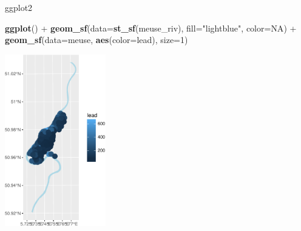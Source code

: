 \documentclass[11pt,ignorenonframetext,]{beamer}
\newenvironment{Shaded}{}{}
\newcommand{\KeywordTok}[1]{\textcolor[rgb]{0.00,0.44,0.13}{\textbf{#1}}}
\newcommand{\DataTypeTok}[1]{\textcolor[rgb]{0.56,0.13,0.00}{#1}}
\newcommand{\DecValTok}[1]{\textcolor[rgb]{0.25,0.63,0.44}{#1}}
\newcommand{\StringTok}[1]{\textcolor[rgb]{0.25,0.44,0.63}{#1}}
\newcommand{\OtherTok}[1]{\textcolor[rgb]{0.00,0.44,0.13}{#1}}
\newcommand{\OperatorTok}[1]{\textcolor[rgb]{0.40,0.40,0.40}{#1}}
\newcommand{\NormalTok}[1]{#1}
\let\oldShaded\Shaded
\let\endoldShaded\endShaded
\renewenvironment{Shaded}{\footnotesize\begin{spacing}{0.9}\oldShaded}{\endoldShaded\end{spacing}}
\let\oldverbatim\verbatim
\let\endoldverbatim\endverbatim
\newcommand{\scriptoutput}{
  \renewenvironment{Shaded}{\scriptsize\begin{spacing}{0.9}\oldShaded}{\endoldShaded\end{spacing}}
  \renewenvironment{verbatim}{\scriptsize\begin{spacing}{0.9}\oldverbatim}{\endoldverbatim\end{spacing}}
}
\begin{document}
\begin{frame}[fragile,t]{ggplot2}

\scriptoutput

\begin{Shaded}
\begin{Highlighting}[]
\KeywordTok{ggplot}\NormalTok{() }\OperatorTok{+}
\StringTok{  }\KeywordTok{geom_sf}\NormalTok{(}\DataTypeTok{data=}\KeywordTok{st_sf}\NormalTok{(meuse_riv), }\DataTypeTok{fill=}\StringTok{"lightblue"}\NormalTok{, }\DataTypeTok{color=}\OtherTok{NA}\NormalTok{) }\OperatorTok{+}
\StringTok{  }\KeywordTok{geom_sf}\NormalTok{(}\DataTypeTok{data=}\NormalTok{meuse, }\KeywordTok{aes}\NormalTok{(}\DataTypeTok{color=}\NormalTok{lead), }\DataTypeTok{size=}\DecValTok{1}\NormalTok{)}
\end{Highlighting}
\end{Shaded}

\begin{center}\includegraphics[width=0.33\textwidth]{Lec17_files/figure-beamer/unnamed-chunk-12-1} \end{center}

\end{frame}
\end{document}
